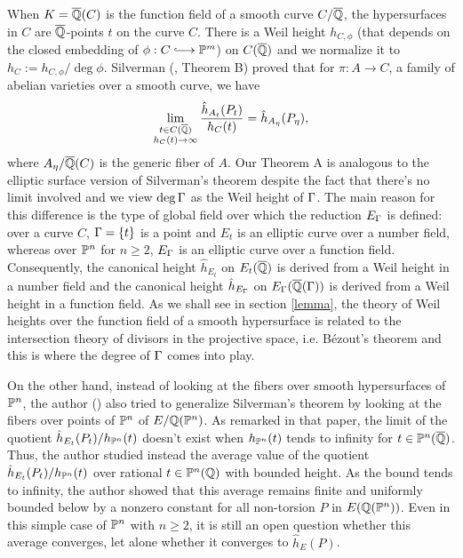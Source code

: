 \documentclass[12pt,reqno]{amsart}
\begin{document}
When $K=\overline{\mathbb{Q}}(C)$ is the function field of a smooth curve $C/\overline{\mathbb{Q}}$, the hypersurfaces in $C$ are $\overline{\mathbb{Q}}$-points $t$ on the curve $C$. There is a Weil height $h_{C,\phi}$ (that depends on the closed embedding of $\phi : C \longhookrightarrow \PP^m$) on $C(\overline{\mathbb{Q}})$ and we normalize it to $h_C:=h_{C,\phi}/\deg \phi$. Silverman (\cite{SHS}, Theorem B) proved that for $\pi : A\longrightarrow C$, a family of abelian varieties over a smooth curve, we have
$$\lim_{\substack{t \in  C(\overline{\mathbb{Q}}) \\ h_{C}(t) \rightarrow \infty} }   \frac{\hat{h}_{A_{t}}(P_{t})}{h_{C}(t)} = \hat{h}_{A_\eta}(P_\eta), $$ where $A_\eta/\overline{\mathbb{Q}}(C)$ is the generic fiber of $A$. Our Theorem A is analogous to the elliptic surface version of Silverman's theorem despite the fact that there's no limit involved and we view $\deg \Gamma$ as the Weil height of $\Gamma$. The main reason for this difference is the type of global field over which the reduction  $E_\Gamma$ is defined: over a curve $C$, $\Gamma=\{t\}$ is a point and $E_t$ is an elliptic curve over a number field, whereas over $\mathbb{P}^n$ for $n \geq 2$, $E_{\Gamma}$ is an elliptic curve over a function field. Consequently, the canonical height $\hat{h}_{E_{t}}$ on $E_{t}(\overline{\mathbb{Q}})$ is derived from a Weil height in a number field and the canonical height $\hat{h}_{E_{\Gamma}}$ on $E_{\Gamma}(\overline{\mathbb{Q}}(\Gamma))$ is derived from  a Weil height in a function field. As we shall see in section \ref{lemma}, the theory of Weil heights over the function field of a smooth hypersurface is related to the intersection theory of divisors in the projective space, i.e. B\'ezout's theorem and this is where the degree of $\Gamma$ comes into play.

On the other hand, instead of looking at the fibers over smooth hypersurfaces of $\mathbb{P}^n$, the author (\cite{WWP}) also tried to generalize Silverman's theorem %
by looking at the fibers over points of $\mathbb{P}^n$ of $E/\mathbb{Q}(\mathbb{P}^n)$. As remarked in that paper, the limit of the quotient $\hat{h}_{E_{t}}(P_t)/h_{\mathbb{P}^n}(t) $ doesn't exist when $h_{\mathbb{P}^n}(t)$ tends to infinity for $t \in \mathbb{P}^n(\overline{\mathbb{Q}})$. Thus, the author studied instead the average value of the quotient $\hat{h}_{E_{t}}(P_t)/h_{\mathbb{P}^n}(t)$ over rational $t \in \mathbb{P}^n(\mathbb{Q})$ with bounded height. As the bound tends to infinity, the author showed that this average remains finite and uniformly bounded below by a nonzero constant for all non-torsion $P$ in $E(\mathbb{Q}(\mathbb{P}^n))$. Even in this simple case of $\mathbb{P}^n$ with $n\geq 2$, it is still an open question whether this average converges, let alone whether it converges to $\hat{h}_{E}(P)$. 
\end{document}
